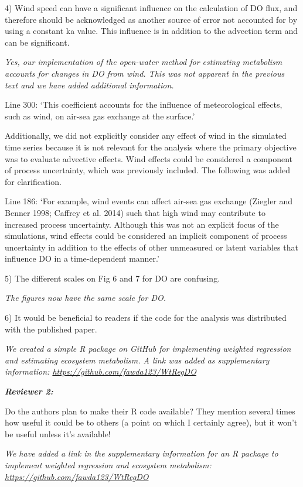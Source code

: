 \documentclass[letterpaper,12pt]{article}\usepackage[]{graphicx}\usepackage[]{color}
\newcommand{\Bigtxt}[1]{\textbf{\textit{#1}}}
\begin{document}
4) Wind speed can have a significant influence on the calculation of DO flux, and therefore should be acknowledged as another source of error not accounted for by using a constant ka value. This influence is in addition to the advection term and can be significant.

{\it Yes, our implementation of the open-water method for estimating metabolism accounts for changes in DO from wind.  This was not apparent in the previous text and we have added additional information.

Line 300: `This coefficient accounts for the influence of meteorological effects, such as wind, on air-sea gas exchange at the surface.'

Additionally, we did not explicitly consider any effect of wind in the simulated time series because it is not relevant for the analysis where the primary objective was to evaluate advective effects.  Wind effects could be considered a component of process uncertainty, which was previously included.  The following was added for clarification.

Line 186: `For example, wind events can affect air-sea gas exchange (Ziegler and Benner 1998; Caffrey et al. 2014) such that high wind may contribute to increased process uncertainty.  Although this was not an explicit focus of the simulations, wind effects could be considered an implicit component of process uncertainty in addition to the effects of other unmeasured or latent variables that influence DO in a time-dependent manner.'
}

5) The different scales on Fig 6 and 7 for DO are confusing. 

{\it The figures now have the same scale for DO.}

6) It would be beneficial to readers if the code for the analysis was distributed with the published paper.

{\it We created a simple R package on GitHub for implementing weighted regression and estimating ecosystem metabolism. A link was added as supplementary information: \href{https://github.com/fawda123/WtRegDO}{https://github.com/fawda123/WtRegDO}}  

\Bigtxt{Reviewer 2:}

Do the authors plan to make their R code available? They mention several times how useful it could be to others (a point on which I certainly agree), but it won’t be useful unless it’s available!

{\it We have added a link in the supplementary information for an R package to implement weighted regression and ecosystem metabolism: \href{https://github.com/fawda123/WtRegDO}{https://github.com/fawda123/WtRegDO}}
\end{document}
